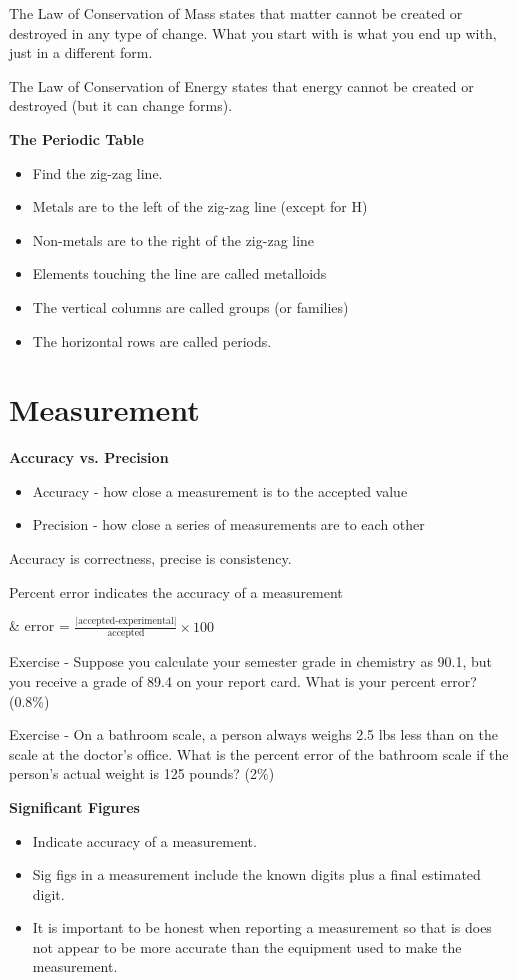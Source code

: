 \documentclass[../hchem.tex]{subfiles}
\begin{document}
The Law of Conservation of Mass states that matter cannot be created or destroyed in any type of change. What you start with is what you end up with, just in a different form.

The Law of Conservation of Energy states that energy cannot be created or destroyed (but it can change forms).

\textbf{The Periodic Table}
\begin{itemize}
    \item Find the zig-zag line.
    \item Metals are to the left of the zig-zag line (except for H)
    \item Non-metals are to the right of the zig-zag line
    \item Elements touching the line are called metalloids
    \item The vertical columns are called groups (or families)
    \item The horizontal rows are called periods.
\end{itemize}

\section{Measurement}
\textbf{Accuracy vs. Precision}
\begin{itemize}
    \item Accuracy - how close a measurement is to the accepted value 
    \item Precision - how close a series of measurements are to each other 
\end{itemize}
Accuracy is correctness, precise is consistency.

Percent error indicates the accuracy of a measurement 
\begin{center}
    \& error = $\frac{\text{|accepted-experimental|}}{\text{accepted}}\times 100$
\end{center}

Exercise - Suppose you calculate your semester grade in chemistry as 90.1, but you receive a grade 
of 89.4 on your report card. What is your percent error? (0.8\%)

Exercise - On a bathroom scale, a person always weighs 2.5 lbs less than on the scale at the doctor's office. What is the 
percent error of the bathroom scale if the person's actual weight is 125 pounds? (2\%)

\textbf{Significant Figures}
\begin{itemize}
    \item Indicate accuracy of a measurement.
    \item Sig figs in a measurement include the known digits plus a final estimated digit.
    \item It is important to be honest when reporting a measurement so that is does not appear to be more accurate than the equipment used to make the measurement.
\end{itemize}
\end{document}
